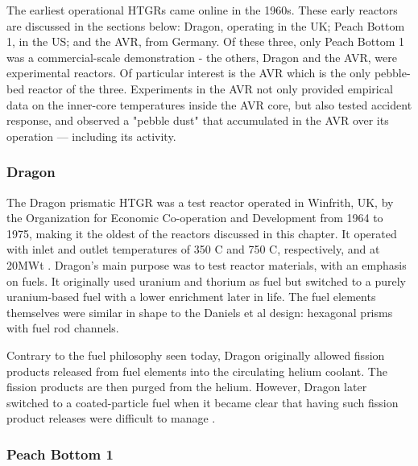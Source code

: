The earliest operational HTGRs came online in the 1960s.  These early reactors are discussed in the sections below: Dragon, operating in the UK; Peach Bottom 1, in the US; and the AVR, from Germany.  Of these three, only Peach Bottom 1 was a commercial-scale demonstration - the others, Dragon and the AVR, were experimental reactors.  Of particular interest is the AVR which is the only pebble-bed reactor of the three.  Experiments in the AVR not only provided empirical data on the inner-core temperatures inside the AVR core, but also tested accident response, and observed a "pebble dust" that accumulated in the AVR over its operation --- including its activity.

\subsubsection{Dragon}
\label{dragon}

The Dragon prismatic HTGR was a test reactor operated in Winfrith, UK, by the Organization for Economic Co-operation and Development from 1964 to 1975, making it the oldest of the reactors discussed in this chapter.  It operated with inlet and outlet temperatures of 350 \textdegree C and 750 \textdegree C, respectively, and at 20MWt \cite{beck_high_nodate}.  Dragon's main purpose was to test reactor materials, with an emphasis on fuels.  It originally used uranium and thorium as fuel but switched to a purely uranium-based fuel with a lower enrichment later in life.  The fuel elements themselves were similar in shape to the Daniels et al design: hexagonal prisms with fuel rod channels.

Contrary to the fuel philosophy seen today, Dragon originally allowed fission products released from fuel elements into the circulating helium coolant.  The fission products are then purged from the helium.  However, Dragon later switched to a coated-particle fuel when it became clear that having such fission product releases were difficult to manage \cite{simnad_early_1991}.

\subsubsection{Peach Bottom 1}\
\label{peach}

